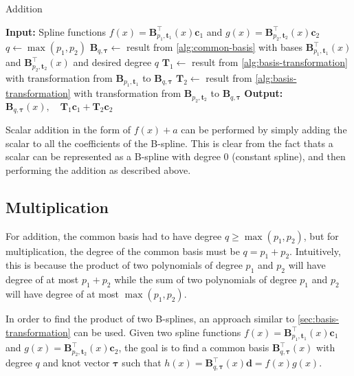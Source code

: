\begin{algorithm}
    \caption{Addition}\label{alg:addition}
    \begin{algorithmic}[1]
        \State \textbf{Input:} Spline functions $f(x) = \mathbf{B}_{p_1, \mathbf{t}_1}^{\top}(x) \mathbf{c}_1$ and $g(x) = \mathbf{B}_{p_2, \mathbf{t}_2}^{\top}(x) \mathbf{c}_2$
        \State $q \gets \max(p_1, p_2)$
        \State $\mathbf B_{q, \boldsymbol{\tau}} \gets $ result from \cref{alg:common-basis} with bases $\mathbf{B}_{p_1, \mathbf{t}_1}^{\top}(x)$ and $\mathbf{B}_{p_2, \mathbf{t}_2}^{\top}(x)$ and desired degree $q$
        \State $\mathbf T_1 \gets $ result from \cref{alg:basis-transformation} with transformation from $\mathbf B_{p_1, \mathbf{t}_1}$ to $\mathbf B_{q, \boldsymbol{\tau}}$
        \State $\mathbf T_2 \gets $ result from \cref{alg:basis-transformation} with transformation from $\mathbf B_{p_2, \mathbf{t}_2}$ to $\mathbf B_{q, \boldsymbol{\tau}}$
        \State \textbf{Output:} $\mathbf B_{q, \boldsymbol{\tau}}(x), \quad\mathbf T_1 \mathbf c_1 + \mathbf T_2 \mathbf c_2$
    \end{algorithmic}
\end{algorithm}

Scalar addition in the form of $f(x) + a$ can be performed by simply adding the scalar to all the coefficients of the B-spline. This is clear from the fact thats a scalar can be represented as a B-spline with degree $0$ (constant spline), and then performing the addition as described above. 

\subsection{Multiplication}\label{sec:multiplication}

For addition, the common basis had to have degree $q \geq \max(p_1, p_2)$, but for multiplication, the degree of the common basis must be $q = p_1 + p_2$. Intuitively, this is because the product of two polynomials of degree $p_1$ and $p_2$ will have degree of at most $p_1 + p_2$ while the sum of two polynomials of degree $p_1$ and $p_2$ will have degree of at most $\max(p_1, p_2)$.

In order to find the product of two B-splines, an approach similar to \cref{sec:basis-transformation} can be used. Given two spline functions $f(x) = \mathbf{B}_{p_1, \mathbf{t}_1}^{\top}(x) \mathbf{c}_1$ and $g(x) = \mathbf{B}_{p_2, \mathbf{t}_2}^{\top}(x) \mathbf{c}_2$, the goal is to find a common basis $\mathbf{B}_{q, \boldsymbol{\tau}}^{\top}(x)$ with degree $q$ and knot vector $\boldsymbol{\tau}$ such that $h(x) = \mathbf{B}_{q, \boldsymbol{\tau}}^{\top}(x) \mathbf{d} = f(x)  g(x)$.

